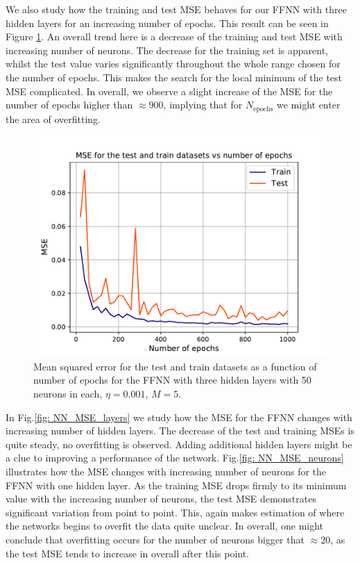 \documentclass{emulateapj}
\begin{document}
We also study how the training and test MSE behaves for our FFNN with three hidden layers for an increasing number of epochs. This result can be seen in Figure \ref{fig: NN_MSE_epochs}. An overall trend here is a decrease of the training and test MSE with increasing number of neurons. The decrease for the training set is apparent, whilst the test value varies significantly throughout the whole range chosen for the number of epochs. This makes the search for the local minimum of the test MSE complicated. In overall, we observe a slight increase of the MSE for the number of epochs higher than $\approx 900$, implying that for  $N_{\mathrm{epochs}}$ we might enter the area of overfitting.

\begin{figure}[h]
    \centering
    \includegraphics[width=.49\textwidth]{Figures/NN_MSE_epochs.pdf}
    \caption{Mean squared error for the test and train datasets as a function of number of epochs for the FFNN with three hidden layers with 50 neurons in each, $\eta=0.001$, $M=5$.}
    \label{fig: NN_MSE_epochs}
\end{figure}

In Fig.\ref{fig: NN_MSE_layers} we study how the MSE for the FFNN changes with increasing number of hidden layers. The decrease of the test and training MSEs is quite steady, no overfitting is observed. Adding additional hidden layers might be a clue to improving a performance of the network. Fig.\ref{fig: NN_MSE_neurons} illustrates how the MSE changes with increasing number of neurons for the FFNN with one hidden layer. As the training MSE drops firmly to its minimum value with the increasing number of neurons, the test MSE demonstrates significant variation from point to point. This, again makes estimation of where the networks begins to overfit the data quite unclear. In overall, one might conclude that overfitting occurs for the number of neurons bigger that $\approx20$, as the test MSE tends to increase in overall after this point. 
\end{document}
